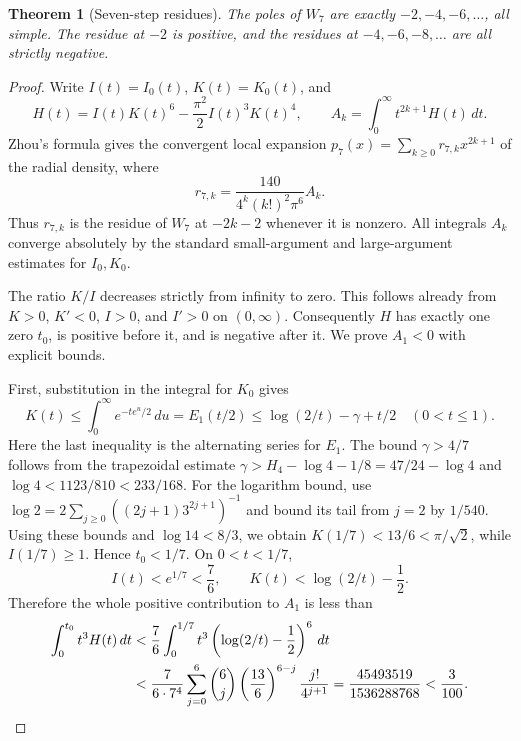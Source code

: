 \documentclass[11pt]{amsart}
\newtheorem{thm}{Theorem}[section]
\theoremstyle{definition}
\begin{document}
\begin{thm}[Seven-step residues]\label{thm:seven-step-poles}
The poles of $W_7$ are exactly $-2,-4,-6,\ldots$, all simple.
The residue at $-2$ is positive, and the residues at $-4,-6,-8,\ldots$
are all strictly negative.
\end{thm}
\begin{proof}
Write $I(t)=I_0(t)$, $K(t)=K_0(t)$, and
\[
 H(t)=I(t)K(t)^6-\frac{\pi^2}{2}I(t)^3K(t)^4,
 \qquad A_k=\int_0^\infty t^{2k+1}H(t)\,dt.
\]
Zhou's formula \cite[Theorem~4.2]{Zho19} gives the convergent local
expansion $p_7(x)=\sum_{k\ge0}r_{7,k}x^{2k+1}$ of the radial density,
where
\begin{equation}\label{eq:seven-residue-integral}
 r_{7,k}=\frac{140}{4^k(k!)^2\pi^6}A_k.
\end{equation}
Thus $r_{7,k}$ is the residue of $W_7$ at $-2k-2$ whenever it is
nonzero. All integrals $A_k$ converge absolutely by the standard
small-argument and large-argument estimates for $I_0,K_0$.

The ratio $K/I$ decreases strictly from infinity to zero. This follows
already from $K>0$, $K'<0$, $I>0$, and $I'>0$ on $(0,\infty)$.
Consequently $H$ has exactly one zero $t_0$, is positive before it,
and is negative after it. We prove $A_1<0$ with explicit bounds.

First, substitution in the integral for $K_0$ gives
\[
 K(t)\le \int_0^\infty e^{-te^u/2}\,du
 =E_1(t/2)\le\log(2/t)-\gamma+t/2\quad(0<t\le1).
\]
Here the last inequality is the alternating series for $E_1$.
The bound $\gamma>4/7$ follows from the trapezoidal estimate
$\gamma>H_4-\log4-1/8=47/24-\log4$ and
$\log4<1123/810<233/168$.  For the logarithm bound, use
$\log2=2\sum_{j\ge0}((2j+1)3^{2j+1})^{-1}$ and bound its tail
from $j=2$ by $1/540$.
Using these bounds and $\log14<8/3$, we obtain
$K(1/7)<13/6<\pi/\sqrt2$, while $I(1/7)\ge1$.
Hence $t_0<1/7$. On $0<t<1/7$,
\[
 I(t)<e^{1/7}<\frac76,
 \qquad K(t)<\log(2/t)-\frac12.
\]
Therefore the whole positive contribution to $A_1$ is less than
\begin{align}
 \int_0^{t_0}t^3H(t)\,dt
 &<\frac76\int_0^{1/7}t^3
                \left(\log(2/t)-\frac12\right)^6\,dt\notag\\
 &<\frac{7}{6\cdot7^4}
       \sum_{j=0}^6\binom6j\left(\frac{13}{6}\right)^{6-j}
                       \frac{j!}{4^{j+1}}
   =\frac{45493519}{1536288768}<\frac3{100}.
   \label{eq:seven-positive-bound}
\end{align}


\end{proof}
\end{document}
